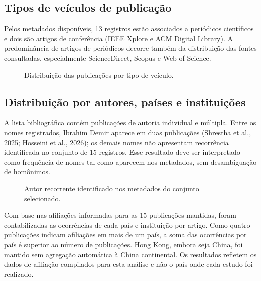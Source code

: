 \subsection{Tipos de veículos de publicação}

Pelos metadados disponíveis, 13 registros estão associados a periódicos científicos e dois são artigos de conferência (IEEE Xplore e ACM Digital Library). A predominância de artigos de periódicos decorre também da distribuição das fontes consultadas, especialmente ScienceDirect, Scopus e Web of Science. 

\begin{figure}[htbp]
\centering

\caption{Distribuição das publicações por tipo de veículo.}
\label{fig:tipos-veiculo}
\end{figure}

\subsection{Distribuição por autores, países e instituições}

A lista bibliográfica contém publicações de autoria individual e múltipla. Entre os nomes registrados, Ibrahim Demir aparece em duas publicações (Shrestha et al., 2025; Hosseini et al., 2026); os demais nomes não apresentam recorrência identificada no conjunto de 15 registros. Esse resultado deve ser interpretado como frequência de nomes tal como aparecem nos metadados, sem desambiguação de homônimos.

\begin{figure}[htbp]
\centering

\caption{Autor recorrente identificado nos metadados do conjunto selecionado.}
\label{fig:autores-recorrentes}
\end{figure}

Com base nas afiliações informadas para as 15 publicações mantidas, foram contabilizadas as ocorrências de cada país e instituição por artigo. Como quatro publicações indicam afiliações em mais de um país, a soma das ocorrências por país é superior ao número de publicações. Hong Kong, embora seja China, foi mantido sem agregação automática à China continental. Os resultados refletem os dados de afiliação compilados para esta análise e não o país onde cada estudo foi realizado.

